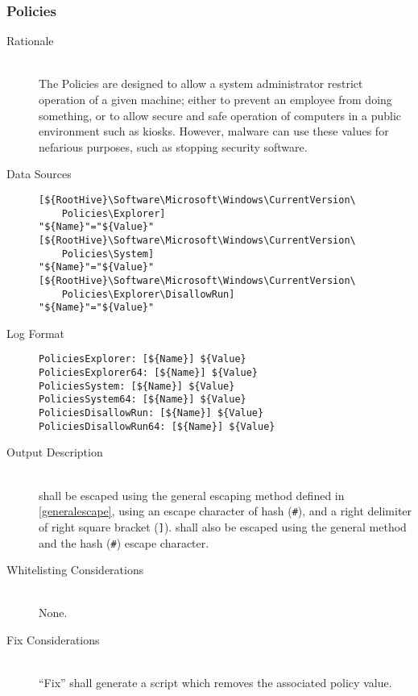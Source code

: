 \subsubsection{Policies}
\begin{description}
\item[Rationale] \hfill \\
The Policies are designed to allow a system administrator restrict operation of
a given machine; either to prevent an employee from doing something, or to allow
secure and safe operation of computers in a public environment such as kiosks.
However, malware can use these values for nefarious purposes, such as stopping
security software.
\item[Data Sources] \hfill
\vspace{-\baselineskip}
\begin{verbatim}
[${RootHive}\Software\Microsoft\Windows\CurrentVersion\
    Policies\Explorer]
"${Name}"="${Value}"
[${RootHive}\Software\Microsoft\Windows\CurrentVersion\
    Policies\System]
"${Name}"="${Value}"
[${RootHive}\Software\Microsoft\Windows\CurrentVersion\
    Policies\Explorer\DisallowRun]
"${Name}"="${Value}"
\end{verbatim}
\item[Log Format] \hfill
\vspace{-\baselineskip}
\begin{verbatim}
PoliciesExplorer: [${Name}] ${Value}
PoliciesExplorer64: [${Name}] ${Value}
PoliciesSystem: [${Name}] ${Value}
PoliciesSystem64: [${Name}] ${Value}
PoliciesDisallowRun: [${Name}] ${Value}
PoliciesDisallowRun64: [${Name}] ${Value}
\end{verbatim}
\item[Output Description] \hfill \\
\var{Name} shall be escaped using the general escaping method defined in
\ref{generalescape}, using an escape character of hash (\verb|#|), and a right
delimiter of right square bracket (\verb|]|).  shall also be escaped
using the general method and the hash (\verb|#|) escape character.
\item[Whitelisting Considerations] \hfill \\
None.
\item[Fix Considerations] \hfill \\
``Fix'' shall generate a script which removes the associated policy value.
\end{description}

